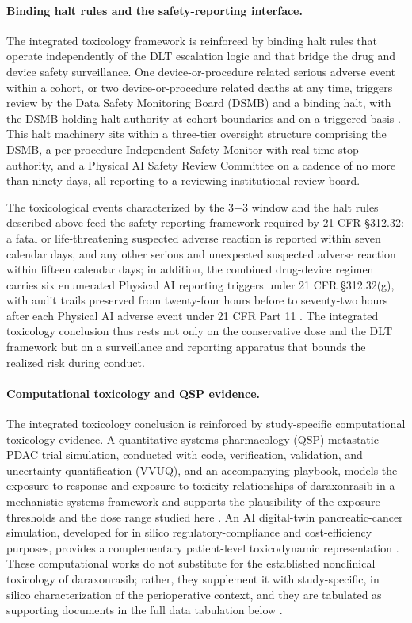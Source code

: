 \paragraph{Binding halt rules and the safety-reporting interface.}
The integrated toxicology framework is reinforced by binding halt rules that
operate independently of the DLT escalation logic and that bridge the drug and
device safety surveillance. One device-or-procedure related serious adverse event
within a cohort, or two device-or-procedure related deaths at any time, triggers
review by the Data Safety Monitoring Board (DSMB) and a binding halt, with the DSMB
holding halt authority at cohort boundaries and on a triggered basis
\cite{onpremwhippl}. This halt machinery sits within a three-tier oversight
structure comprising the DSMB, a per-procedure Independent Safety Monitor with
real-time stop authority, and a Physical AI Safety Review Committee on a cadence of
no more than ninety days, all reporting to a reviewing institutional review board.

The toxicological events characterized by the 3+3 window and the halt rules
described above feed the safety-reporting framework required by 21 CFR \S 312.32:
a fatal or life-threatening suspected adverse reaction is reported within seven
calendar days, and any other serious and unexpected suspected adverse reaction
within fifteen calendar days; in addition, the combined drug-device regimen carries
six enumerated Physical AI reporting triggers under 21 CFR \S 312.32(g), with audit
trails preserved from twenty-four hours before to seventy-two hours after each
Physical AI adverse event under 21 CFR Part 11 \cite{cfr312paiuni,onpremwhippl}.
The integrated toxicology conclusion thus rests not only on the conservative dose
and the DLT framework but on a surveillance and reporting apparatus that bounds the
realized risk during conduct.

\clearpage

\paragraph{Computational toxicology and QSP evidence.}
The integrated toxicology conclusion is reinforced by study-specific computational
toxicology evidence. A quantitative systems pharmacology (QSP) metastatic-PDAC
trial simulation, conducted with code, verification, validation, and uncertainty
quantification (VVUQ), and an accompanying playbook, models the exposure to
response and exposure to toxicity relationships of daraxonrasib in a mechanistic
systems framework and supports the plausibility of the exposure thresholds and
the dose range studied here \cite{qspmetpancre}. An AI digital-twin
pancreatic-cancer simulation, developed for in silico regulatory-compliance and
cost-efficiency purposes, provides a complementary patient-level
toxicodynamic representation \cite{fdadigtwinpc}. These computational works do
not substitute for the established nonclinical toxicology of daraxonrasib;
rather, they supplement it with study-specific, in silico characterization of the
perioperative context, and they are tabulated as supporting documents in the full
data tabulation below \cite{qspmetpancre,fdadigtwinpc}.

